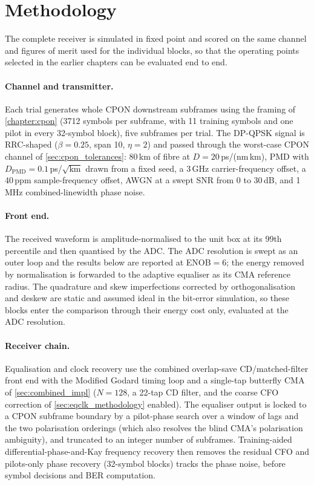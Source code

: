 \documentclass[12pt,a4paper]{report}
\begin{document}
\section{Methodology}
The complete receiver is simulated in fixed point and scored on the same channel and figures of merit used for the individual blocks, so that the operating points selected in the earlier chapters can be evaluated end to end.

\paragraph{Channel and transmitter.} Each trial generates whole CPON downstream subframes using the framing of \cref{chapter:cpon} (3712 symbols per subframe, with 11 training symbols and one pilot in every 32-symbol block), five subframes per trial. The DP-QPSK signal is RRC-shaped ($\beta = 0.25$, span 10, $\eta = 2$) and passed through the worst-case CPON channel of \cref{sec:cpon_tolerances}: 80\,km of fibre at $D = 20$\,ps/(nm\,km), PMD with $D_\mathrm{PMD} = 0.1$\,ps/$\sqrt{\mathrm{km}}$ drawn from a fixed seed, a 3\,GHz carrier-frequency offset, a 40\,ppm sample-frequency offset, AWGN at a swept SNR from 0 to 30\,dB, and 1\,MHz combined-linewidth phase noise.

\paragraph{Front end.} The received waveform is amplitude-normalised to the unit box at its 99th percentile and then quantised by the ADC. The ADC resolution is swept as an outer loop and the results below are reported at ENOB$=6$; the energy removed by normalisation is forwarded to the adaptive equaliser as its CMA reference radius. The quadrature and skew imperfections corrected by orthogonalisation and deskew are static and assumed ideal in the bit-error simulation, so these blocks enter the comparison through their energy cost only, evaluated at the ADC resolution.

\paragraph{Receiver chain.} Equalisation and clock recovery use the combined overlap-save CD/matched-filter front end with the Modified Godard timing loop and a single-tap butterfly CMA of \cref{sec:combined_impl} ($N = 128$, a 22-tap CD filter, and the coarse CFO correction of \cref{sec:eqclk_methodology} enabled). The equaliser output is locked to a CPON subframe boundary by a pilot-phase search over a window of lags and the two polarisation orderings (which also resolves the blind CMA's polarisation ambiguity), and truncated to an integer number of subframes. Training-aided differential-phase-and-Kay frequency recovery then removes the residual CFO and pilots-only phase recovery (32-symbol blocks) tracks the phase noise, before symbol decisions and BER computation.
\end{document}
